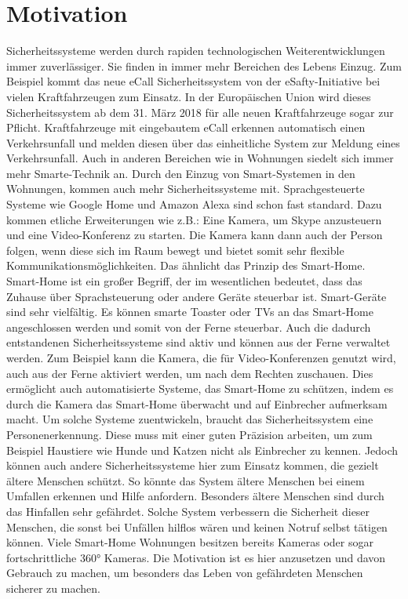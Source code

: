 \section{Motivation}
Sicherheitssysteme werden durch rapiden technologischen Weiterentwicklungen immer zuverlässiger. Sie finden in immer mehr Bereichen des Lebens Einzug. Zum Beispiel kommt das neue eCall Sicherheitssystem von der eSafty-Initiative bei vielen Kraftfahrzeugen zum Einsatz. In der Europäischen Union wird dieses Sicherheitssystem ab dem 31. März 2018 für alle neuen Kraftfahrzeuge sogar zur Pflicht. Kraftfahrzeuge mit eingebautem eCall erkennen automatisch einen Verkehrsunfall und melden diesen über das einheitliche System zur Meldung eines Verkehrsunfall. Auch in anderen Bereichen wie in Wohnungen siedelt sich immer mehr Smarte-Technik an. Durch den Einzug von Smart-Systemen in den Wohnungen, kommen auch mehr Sicherheitssysteme mit. Sprachgesteuerte Systeme wie Google Home und Amazon Alexa sind schon fast standard. Dazu kommen etliche Erweiterungen wie z.B.: Eine Kamera, um Skype anzusteuern und eine Video-Konferenz zu starten. Die Kamera kann dann auch der Person folgen, wenn diese sich im Raum bewegt und bietet somit sehr flexible Kommunikationsmöglichkeiten. Das ähnlicht das Prinzip des Smart-Home. Smart-Home ist ein großer Begriff, der im wesentlichen bedeutet, dass das Zuhause über Sprachsteuerung oder andere Geräte steuerbar ist. Smart-Geräte sind sehr vielfältig. Es können smarte Toaster oder TVs an das Smart-Home angeschlossen werden und somit von der Ferne steuerbar. Auch die dadurch entstandenen Sicherheitssysteme sind aktiv und können aus der Ferne verwaltet werden. Zum Beispiel kann die Kamera, die für Video-Konferenzen genutzt wird, auch aus der Ferne aktiviert werden, um nach dem Rechten zuschauen. Dies ermöglicht auch automatisierte Systeme, das Smart-Home zu schützen, indem es durch die Kamera das Smart-Home überwacht und auf Einbrecher aufmerksam macht. Um solche Systeme zuentwickeln, braucht das Sicherheitssystem eine Personenerkennung. Diese muss mit einer guten Präzision arbeiten, um zum Beispiel Haustiere wie Hunde und Katzen nicht als Einbrecher zu kennen. Jedoch können auch andere Sicherheitssysteme hier zum Einsatz kommen, die gezielt ältere Menschen schützt. So könnte das System ältere Menschen bei einem Umfallen erkennen und Hilfe anfordern. Besonders ältere Menschen sind durch das Hinfallen sehr gefährdet. Solche System verbessern die Sicherheit dieser Menschen, die sonst bei Unfällen hilflos wären und keinen Notruf selbst tätigen können. Viele Smart-Home Wohnungen besitzen bereits Kameras oder sogar fortschrittliche 360° Kameras. Die Motivation ist es hier anzusetzen und davon Gebrauch zu machen, um besonders das Leben von gefährdeten Menschen sicherer zu machen.

